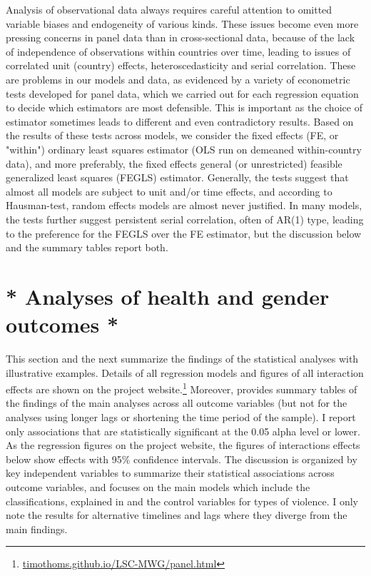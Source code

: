 \documentclass[12pt]{article}
\begin{document}
Analysis of observational data always requires careful attention to omitted variable biases and endogeneity of various kinds.
These issues become even more pressing concerns in panel data than in cross-sectional data, because of the lack of independence of observations within countries over time, leading to issues of correlated unit (country) effects, heteroscedasticity and serial correlation.
These are problems in our models and data, as evidenced by a variety of econometric tests developed for panel data, which we carried out for each regression equation to decide which estimators are most defensible.
This is important as the choice of estimator sometimes leads to different and even contradictory results.
Based on the results of these tests across models, we consider the fixed effects (FE, or "within") ordinary least squares estimator (OLS run on demeaned within-country data), and more preferably, the fixed effects general (or unrestricted) feasible generalized least squares (FEGLS) estimator.
Generally, the tests suggest that almost all models are subject to unit and/or time effects, and according to Hausman-test, random effects models are almost never justified. In many models, the tests further suggest persistent serial correlation, often of AR(1) type, leading to the preference for the FEGLS over the FE estimator, but the discussion below and the summary tables report both.

\section{* Analyses of health and gender outcomes *}
\label{results_hg}

This section and the next summarize the findings of the statistical analyses with illustrative examples. Details of all regression models and figures of all interaction effects are shown on the project website.\footnote{\href{https://timothoms.github.io/LSC-MWG/panel.html}{timothoms.github.io/LSC-MWG/panel.html}} Moreover,  provides summary tables of the  findings of the main analyses across all outcome variables (but not for the analyses using longer lags or shortening the time period of the sample).
I report only associations that are statistically significant at the 0.05 alpha level or lower. As the regression figures on the project website, the figures of interactions effects below show effects with 95\% confidence intervals.
The discussion is organized by key independent variables to summarize their statistical associations across outcome variables, and focuses on the main models which include the classifications, explained in  and the control variables for types of violence. I only note the results for alternative timelines and lags where they diverge from the main findings.
\end{document}
